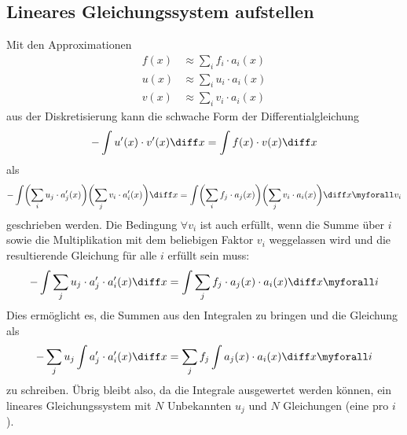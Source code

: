 \subsection{Lineares Gleichungssystem aufstellen\label{fem:1d:lineares_gleichungssystem}}
Mit den Approximationen 
\begin{align}
    f(x) &\approx \sum_i f_i \cdot a_i(x) \\
    u(x) &\approx \sum_i u_i \cdot a_i(x) \\
    v(x) &\approx \sum_i v_i \cdot a_i(x)
\end{align}
aus der Diskretisierung kann die schwache Form der Differentialgleichung 
\begin{equation}
    - \int u'(x) \cdot v'(x) \diff x = \int f(x) \cdot v(x) \diff x
\end{equation}
als
\begin{equation}
    - \int \biggl(\sum_i u_j \cdot a'_j(x)\biggr) \biggl(\sum_j v_i \cdot a'_i(x)\biggr) \diff x 
    = \int \biggl(\sum_i f_j \cdot a_j(x) \biggr) \biggl(\sum_j v_i \cdot a_i(x) \biggr) \diff x 
    \myforall v_i
\end{equation}
geschrieben werden.
Die Bedingung $\forall v_i$ ist auch erfüllt, wenn die Summe über $i$ sowie die Multiplikation mit dem beliebigen Faktor $v_i$ weggelassen wird und die resultierende Gleichung für alle $i$ erfüllt sein muss: %
\begin{equation}
    - \int \sum_j u_j \cdot a'_j \cdot a'_i(x) \diff x = \int \sum_j f_j \cdot a_j(x) \cdot a_i(x) \diff x \myforall i
\end{equation}
Dies ermöglicht es, die Summen aus den Integralen zu bringen und die Gleichung als
\begin{equation}
    - \sum_j u_j \int a'_j \cdot a'_i(x) \diff x = \sum_j f_j \int a_j(x) \cdot a_i(x) \diff x \myforall i \label{papers:fem:prinzip1d:finale_gleichung}
\end{equation}
zu schreiben.
Übrig bleibt also, da die Integrale ausgewertet werden können, ein lineares Gleichungssystem mit $N$ Unbekannten $u_j$ und $N$ Gleichungen (eine pro $i$). 


